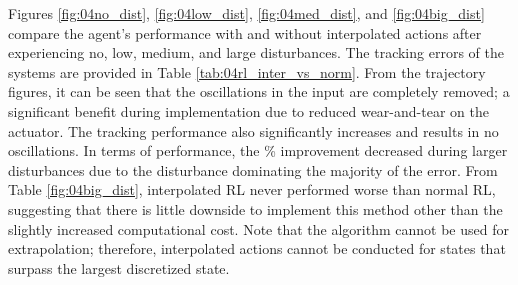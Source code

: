 Figures \ref{fig:04no_dist}, \ref{fig:04low_dist}, \ref{fig:04med_dist}, and \ref{fig:04big_dist} compare the agent's performance with and without interpolated actions after experiencing no, low, medium, and large disturbances.  The tracking errors of the systems are provided in Table \ref{tab:04rl_inter_vs_norm}.  From the trajectory figures, it can be seen that the oscillations in the input are completely removed; a significant benefit during implementation due to reduced wear-and-tear on the actuator.  The tracking performance also significantly increases and results in no oscillations.  In terms of performance, the \% improvement decreased during larger disturbances due to the disturbance dominating the majority of the error. From Table \ref{fig:04big_dist}, interpolated RL never performed worse than normal RL, suggesting that there is little downside to implement this method other than the slightly increased computational cost.  Note that the algorithm cannot be used for extrapolation; therefore, interpolated actions cannot be conducted for states that surpass the largest discretized state.

